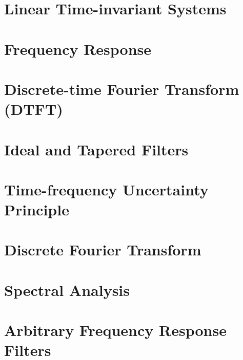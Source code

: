 \documentclass{tufte-book}
\begin{document}
\ifSpLTI
\chapter{Linear Time-invariant Systems}





\fi

\ifSpFResp
\chapter{Frequency Response}



\fi



\ifSpDTFT
\chapter{Discrete-time Fourier Transform (DTFT)}



\fi

\ifSpFilters
\chapter{Ideal and Tapered Filters}



\fi

\ifSpUncertainty
\chapter{Time-frequency Uncertainty Principle}



\fi

\ifSpDFT
\chapter{Discrete Fourier Transform}

\fi

\ifSpSpectAn
\chapter{Spectral Analysis}



\fi

\ifSpFiltering
\chapter{Arbitrary Frequency Response Filters}



\fi
\end{document}

